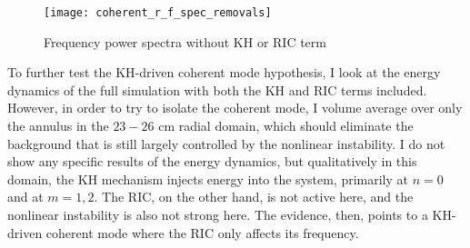\begin{figure}
\centerline{\texttt{[image: coherent\_r\_f\_spec\_removals]}}
\caption{Frequency power spectra without KH or RIC term}
\label{coherent_r_f_spec_removals}
\end{figure}

To further test the KH-driven coherent mode hypothesis, I look at the energy dynamics of the full simulation with both the KH and RIC terms included. However, in order to try to isolate the coherent
mode, I volume average over only the annulus in the $23-26$ cm radial domain, which should eliminate the background that is still largely controlled by the nonlinear instability. I do not show
any specific results of the energy dynamics, but qualitatively in this domain, the KH mechanism injects energy into the system, primarily at $n=0$ and at $m=1,2$. The RIC, on the other hand,
is not active here, and the nonlinear instability is also not strong here. The evidence, then, points to a KH-driven coherent mode where the RIC only affects its frequency.

